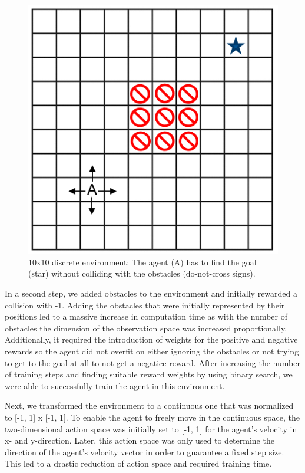\documentclass[conference]{IEEEtran}
\begin{document}
\begin{figure}[htbp]
	\centerline{\includegraphics{discrete.png}}
	\caption{10x10 discrete environment: The agent (A) has to find the goal (star) without colliding with the obstacles (do-not-cross signs).}
	\label{fig3}
\end{figure}

In a second step, we added obstacles to the environment and initially rewarded a collision with -1. Adding the obstacles that were initially represented by their positions led to a massive increase in computation time as with the number of obstacles the dimension of the observation space was increased proportionally. Additionally, it required the introduction of weights for the positive and negative rewards so the agent did not overfit on either ignoring the obstacles or not trying to get to the goal at all to not get a negatice reward. After increasing the number of training steps and finding suitable reward weights by using binary search, we were able to successfully train the agent in this environment.

Next, we transformed the environment to a continuous one that was normalized to [-1, 1] x [-1, 1]. To enable the agent to freely move in the continuous space, the two-dimensional action space was initially set to [-1, 1] for the agent's velocity in x- and y-direction. Later, this action space was only used to determine the direction of the agent's velocity vector in order to guarantee a fixed step size. This led to a drastic reduction of action space and required training time. 
\end{document}
